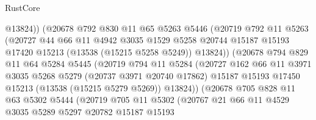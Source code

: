\begin{lexlean}{RustCore}
\begin{coremodule}
                          @13824))
                      (@20678
                        @792
                        @830
                        @11
                        @65
                        @5263
                        @5446
                        (@20719
                          @792
                          @11
                          @5263
                          (@20727
                            @44
                            @66
                            @11
                            @4942
                            @3035
                            @1529
                            @5258
                            @20744
                            @15187
                            @15193
                            @17420
                            @15213
                            (@13538 (@15215 @5258 @5249))
                            @13824))
                        (@20678
                          @794
                          @829
                          @11
                          @64
                          @5284
                          @5445
                          (@20719
                            @794
                            @11
                            @5284
                            (@20727
                              @162
                              @66
                              @11
                              @3971
                              @3035
                              @5268
                              @5279
                              (@20737 @3971 @20740 @17862)
                              @15187
                              @15193
                              @17450
                              @15213
                              (@13538 (@15215 @5279 @5269))
                              @13824))
                          (@20678
                            @705
                            @828
                            @11
                            @63
                            @5302
                            @5444
                            (@20719
                              @705
                              @11
                              @5302
                              (@20767
                                @21
                                @66
                                @11
                                @4529
                                @3035
                                @5289
                                @5297
                                @20782
                                @15187
                                @15193

\end{coremodule}
\end{lexlean}
